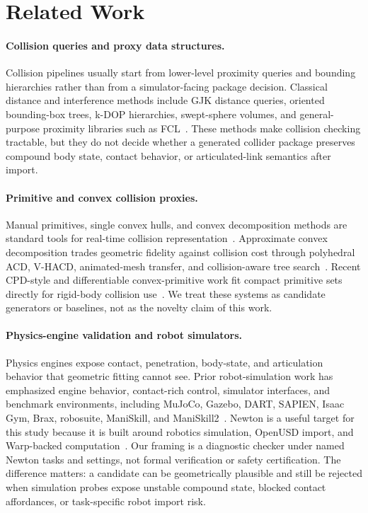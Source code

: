 \section{Related Work}
\label{sec:related}

\paragraph{Collision queries and proxy data structures.}
Collision pipelines usually start from lower-level proximity queries and bounding hierarchies rather than from a simulator-facing package decision.
Classical distance and interference methods include GJK distance queries, oriented bounding-box trees, k-DOP hierarchies, swept-sphere volumes, and general-purpose proximity libraries such as FCL~\cite{gilbert1988gjk,gottschalk1996obbtree,klosowski1998kdop,larsen2000rss,pan2012fcl}.
These methods make collision checking tractable, but they do not decide whether a generated collider package preserves compound body state, contact behavior, or articulated-link semantics after import.

\paragraph{Primitive and convex collision proxies.}
Manual primitives, single convex hulls, and convex decomposition methods are standard tools for real-time collision representation~\cite{ericson2004}.
Approximate convex decomposition trades geometric fidelity against collision cost through polyhedral ACD, V-HACD, animated-mesh transfer, and collision-aware tree search~\cite{lien2007acd,vhacd,thul2018acd,coacd2022}.
Recent CPD-style and differentiable convex-primitive work fit compact primitive sets directly for rigid-body collision use~\cite{cpd2026,tracy2023dcol}.
We treat these systems as candidate generators or baselines, not as the novelty claim of this work.

\paragraph{Physics-engine validation and robot simulators.}
Physics engines expose contact, penetration, body-state, and articulation behavior that geometric fitting cannot see.
Prior robot-simulation work has emphasized engine behavior, contact-rich control, simulator interfaces, and benchmark environments, including MuJoCo, Gazebo, DART, SAPIEN, Isaac Gym, Brax, robosuite, ManiSkill, and ManiSkill2~\cite{todorov2012mujoco,erez2015simtools,koenig2004gazebo,lee2018dart,xiang2020sapien,makoviychuk2021isaacgym,freeman2021brax,zhu2025robosuite,mu2021maniskill,gu2023maniskill2}.
Newton is a useful target for this study because it is built around robotics simulation, OpenUSD import, and Warp-backed computation~\cite{newton2026,warp2022,openusd2026}.
Our framing is a diagnostic checker under named Newton tasks and settings, not formal verification or safety certification.
The difference matters: a candidate can be geometrically plausible and still be rejected when simulation probes expose unstable compound state, blocked contact affordances, or task-specific robot import risk.

